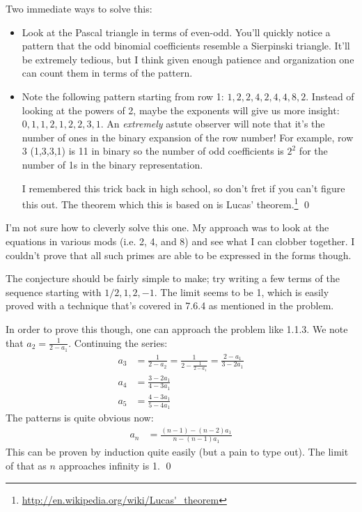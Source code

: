 \documentclass[11pt]{book} %
\begin{document}
\begin{Exercise}
Two immediate ways to solve this: 
\begin{itemize}
	\item Look at the Pascal triangle in terms of even-odd. You'll quickly notice a pattern that the odd binomial
	coefficients resemble a Sierpinski triangle. It'll be extremely tedious, but I think given enough patience and
	organization one can count them in terms of the pattern.
	\item Note the following pattern starting from row 1: $1,2,2,4,2,4,4,8,2$. Instead of looking at the powers of 2,
	maybe the exponents will give us more insight: $0,1,1,2,1,2,2,3,1$. An \emph{extremely} astute observer will
	note that it's the number of ones in the binary expansion of the row number! For example, row 3 (1,3,3,1) is 11 in 
	binary so the number of odd coefficients is $2^2$ for the number of 1s in the binary representation. 

	I remembered this trick back in high school, so don't fret if you can't figure this out. The theorem which this is based
	on is Lucas' theorem.\footnote{\url{http://en.wikipedia.org/wiki/Lucas'\_theorem}} \qed
\end{itemize}
\end{Exercise}

\begin{Exercise}
	I'm not sure how to cleverly solve this one. My approach was to look at the equations in various mods (i.e. 2, 4, and 8) 
	and see what I can clobber together. I couldn't prove that all such primes are able to be expressed in the forms though.
\end{Exercise}

\begin{Exercise}
	The conjecture should be fairly simple to make; try writing a few terms of the sequence starting with $1/2, 1, 2, -1$. 
	The limit seems to be 1, which is easily proved with a technique that's covered in 7.6.4 as mentioned in the problem. 

	In order to prove this though, one can approach the problem like 1.1.3. We note that $a_2 = \frac{1}{2-a_1}$. 
	Continuing the series:
	\begin{align}
		a_3 &= \frac{1}{2-a_2} = \frac{1}{2 - \frac{1}{2-a_1}} = \frac{2-a_1}{3-2a_1} \\
		a_4 &= \frac{3-2a_1}{4-3a_1} \\
		a_5 &= \frac{4-3a_1}{5-4a_1}
	\end{align}
	The patterns is quite obvious now: 
	\begin{align}
		a_n &= \frac{(n-1) - (n-2)a_1}{n - (n-1)a_1}
	\end{align}
	This can be proven by induction quite easily (but a pain to type out). The limit of that as $n$ approaches infinity
	is 1. \qed
\end{Exercise}
\end{document}
